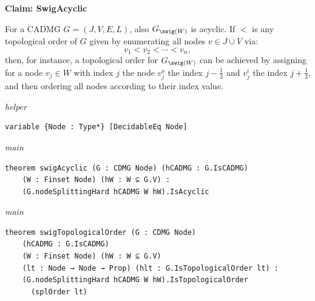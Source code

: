 \vspace{\appendixNotesGap}

\noindent\textbf{Claim: SwigAcyclic}\par\smallskip
{\appendixTexSize
    For a CADMG $G=(J,V,E,L)$, also $G_{\swig(W)}$ is acyclic.
    If $<$ is any topological order of $G$ given by enumerating all nodes $v \in J \cup V$ via:
    \[ v_1 < v_2 < \cdots < v_n,\]
    then, for instance, 
    a topological order for $G_{\swig(W)}$ can be achieved by assigning for a node $v_j \in W$ with index $j$ the node 
    $v_j^o$ the index $j-\frac{1}{3}$
    and $v_j^i$ the index $j+\frac{1}{3}$, and then ordering all nodes according to their index value.
\par}
\smallskip
{\small\textit{helper}}
\begin{verbatim}
variable {Node : Type*} [DecidableEq Node]
\end{verbatim}
{\small\textit{main}}
\begin{verbatim}
theorem swigAcyclic (G : CDMG Node) (hCADMG : G.IsCADMG)
    (W : Finset Node) (hW : W ⊆ G.V) :
    (G.nodeSplittingHard hCADMG W hW).IsAcyclic
\end{verbatim}
{\small\textit{main}}
\begin{verbatim}
theorem swigTopologicalOrder (G : CDMG Node)
    (hCADMG : G.IsCADMG)
    (W : Finset Node) (hW : W ⊆ G.V)
    (lt : Node → Node → Prop) (hlt : G.IsTopologicalOrder lt) :
    (G.nodeSplittingHard hCADMG W hW).IsTopologicalOrder
      (splOrder lt)
\end{verbatim}
~%

\vspace{\appendixNotesGap}

